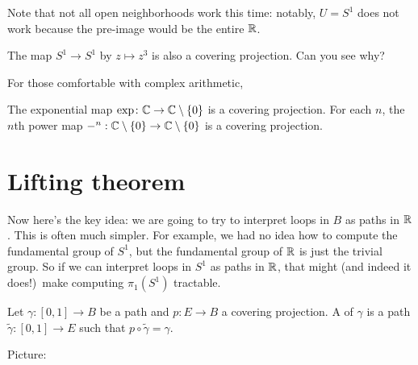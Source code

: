 Note that not all open neighborhoods work this time:
notably, $U = S^1$ does not work because the pre-image
would be the entire $\mathbb R$.

\begin{example}
	The map $S^1 \to S^1$ by
	$z \mapsto z^{3}$ is also a covering projection.
	Can you see why?
\end{example}

\begin{example}
	For those comfortable with complex arithmetic,
	\begin{enumerate}[(a)]
		\ii The exponential map $\exp \colon \mathbb C \to \mathbb C \setminus \{0\}$
		is a covering projection.
		\ii For each $n$, the $n$th power map
		$-^n: \mathbb C \setminus \{0\} \to \mathbb C \setminus \{0\}$
		is a covering projection.
	\end{enumerate}
\end{example}

\section{Lifting theorem}
\label{sec:lifting_thm}
Now here's the key idea: we are going to try to interpret
loops in $B$ as paths in $\mathbb R$.
This is often much simpler.
For example, we had no idea how to compute the fundamental group of $S^1$,
but the fundamental group of $\mathbb R$ is just the trivial group.
So if we can interpret loops in $S^1$ as paths in $\mathbb R$,
that might (and indeed it does!)\ make computing $\pi_1(S^1)$ tractable.

\begin{definition}
	Let $\gamma \colon [0,1] \to B$ be a path and $p \colon E \to B$ a covering projection.
	A  of $\gamma$ is a path $\tilde\gamma \colon [0,1] \to E$
	such that $p \circ \tilde\gamma = \gamma$.
\end{definition}
Picture:
\begin{center}
\end{center}


